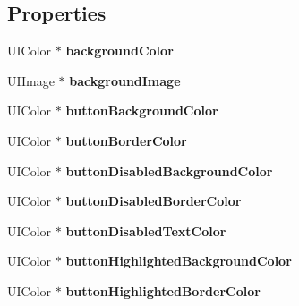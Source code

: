 \subsection*{Properties}
\begin{DoxyCompactItemize}
\item 
\hypertarget{interface_a_k_f_theme_aabfb13d8ef142932948fb5d146ee9423}{}U\+I\+Color $\ast$ {\bfseries background\+Color}\label{interface_a_k_f_theme_aabfb13d8ef142932948fb5d146ee9423}

\item 
\hypertarget{interface_a_k_f_theme_aae31332841544b1919d8fca2820b3b26}{}U\+I\+Image $\ast$ {\bfseries background\+Image}\label{interface_a_k_f_theme_aae31332841544b1919d8fca2820b3b26}

\item 
\hypertarget{interface_a_k_f_theme_a8dd5df7d40399809de6eae32a450f742}{}U\+I\+Color $\ast$ {\bfseries button\+Background\+Color}\label{interface_a_k_f_theme_a8dd5df7d40399809de6eae32a450f742}

\item 
\hypertarget{interface_a_k_f_theme_abdbdc323dcbe97e41e44dd98c8d02c2b}{}U\+I\+Color $\ast$ {\bfseries button\+Border\+Color}\label{interface_a_k_f_theme_abdbdc323dcbe97e41e44dd98c8d02c2b}

\item 
\hypertarget{interface_a_k_f_theme_ab1f373a0198328fa949e4e8234d8b796}{}U\+I\+Color $\ast$ {\bfseries button\+Disabled\+Background\+Color}\label{interface_a_k_f_theme_ab1f373a0198328fa949e4e8234d8b796}

\item 
\hypertarget{interface_a_k_f_theme_ae33fa56822a670843f9cf3224981ff42}{}U\+I\+Color $\ast$ {\bfseries button\+Disabled\+Border\+Color}\label{interface_a_k_f_theme_ae33fa56822a670843f9cf3224981ff42}

\item 
\hypertarget{interface_a_k_f_theme_a117c9729324388dbdeb155f8961a9e27}{}U\+I\+Color $\ast$ {\bfseries button\+Disabled\+Text\+Color}\label{interface_a_k_f_theme_a117c9729324388dbdeb155f8961a9e27}

\item 
\hypertarget{interface_a_k_f_theme_ab6af9989066956ac6af3800f994f48fa}{}U\+I\+Color $\ast$ {\bfseries button\+Highlighted\+Background\+Color}\label{interface_a_k_f_theme_ab6af9989066956ac6af3800f994f48fa}

\item 
\hypertarget{interface_a_k_f_theme_ac6fc0eedfb6be839dab44edc202ad8e2}{}U\+I\+Color $\ast$ {\bfseries button\+Highlighted\+Border\+Color}\label{interface_a_k_f_theme_ac6fc0eedfb6be839dab44edc202ad8e2}


\end{DoxyCompactItemize}
